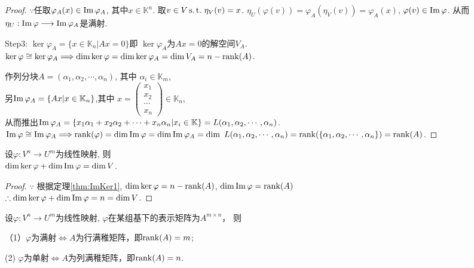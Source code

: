 \begin{proof}
  $\because$任取$ \varphi_A(x) \in \operatorname{Im}\varphi_A  $, 其中$x \in \mathbb{K}^n$.
  取$ v \in V \operatorname{s.t.{}} \eta_V(v) = x $.
  $ \eta_U(\varphi(v)) = \varphi_A(\eta_V(v)) = \varphi_A(x) $,
  $ \varphi(v) \in \operatorname{Im}\varphi $. 从而
  $ \eta_U: \operatorname{Im}\varphi \longrightarrow \operatorname{Im}\varphi_A $是满射.

  Step3: $ \ker\varphi_A =\{x \in \mathbb{K}_n|Ax=0\} $即
  $ \ker\varphi_A $为$ Ax=0 $的解空间$ V_A $.\\
  $ \ker\varphi \cong \ker\varphi_A \Longrightarrow
  \dim\ker\varphi = \dim\ker\varphi_A = \dim V_A = n-\operatorname{rank}(A)$.

  作列分块$ A = (\alpha_1,\alpha_2,\cdots,\alpha_n) $, 其中
  $ \alpha_i \in \mathbb{K}_m$,\\
  另$ \operatorname{Im}\varphi_A = \{Ax|x \in \mathbb{K}_n\} $,其中  
  $ x = \left(\begin{smallmatrix}
    x_1\\
    x_2\\
    \cdots\\
    x_n \end{smallmatrix}\right) \in \mathbb{K}_n $, \\
  从而推出$ \operatorname{Im}\varphi_A = \{
  x_1\alpha_1+x_2\alpha_2+\cdots+x_n\alpha_n|x_i \in \mathbb{K}\}
  = L(\alpha_1, \alpha_2, \cdots, \alpha_n)$.\\
  $ \operatorname{Im}\varphi \cong \operatorname{Im}\varphi_A \Longrightarrow
  \operatorname{rank}(\varphi) = \dim\operatorname{Im}\varphi = \dim\operatorname{Im}\varphi_A
  = \dim\ L(\alpha_1, \alpha_2, \cdots, \alpha_n)\\
  = \operatorname{rank}(\{\alpha_1, \alpha_2, \cdots, \alpha_n\}) = \operatorname{rank}(A) $.
\end{proof}

\begin{deduction}[线性映射的维数公式]\label{thm:ImKer2}
  设$\varphi: V^n \longrightarrow U^m$为线性映射, 则\\
  $\dim\ker\varphi + \dim\operatorname{Im}\varphi = \dim V$.
\end{deduction}

\begin{proof}
  $\because$ 根据定理\ref{thm:ImKer1}, $\dim\ker\varphi = n - \operatorname{rank}(A)$,
  $\dim\operatorname{Im}\varphi = \operatorname{rank}(A)$\\
  $\therefore \dim\ker\varphi + \dim\operatorname{Im}\varphi = n = \dim V$.
\end{proof}

\begin{deduction}
  设$\varphi: V^n \longrightarrow U^m$为线性映射,
  $\varphi$在某组基下的表示矩阵为$A^{m \times n}$， 则

  （1）$\varphi$为满射$\Longleftrightarrow A$为行满稚矩阵，即$\operatorname{rank}(A) = m$;

   (2) $\varphi$为单射$\Longleftrightarrow A$为列满稚矩阵，即$\operatorname{rank}(A) = n$. 
 \end{deduction}

